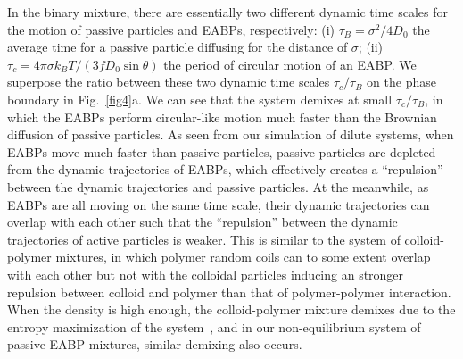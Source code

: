 \documentclass[prl, twocolumn, showpacs, preprintnumbers,amsmath,amssymb]{revtex4-1}
\begin{document}
In the binary mixture, there are essentially two different dynamic time scales for the motion of passive particles and EABPs, respectively: (i) $\tau_B = \sigma^2/4D_0$ the average time for a passive particle diffusing for the distance of $\sigma$; (ii) $\tau_c=4\pi\sigma k_BT/(3 f D_0 \sin\theta )$ the period of circular motion of an EABP. We superpose the ratio between these two dynamic time scales $\tau_c/\tau_B$ on the phase boundary in Fig.~\ref{fig4}a. We can see that the system demixes at small $\tau_c/\tau_B$, in which the EABPs perform circular-like motion much faster than the Brownian diffusion of passive particles. As seen from our simulation of dilute systems, when EABPs move much faster than passive particles, passive particles are depleted from the dynamic trajectories of EABPs, which effectively creates a ``repulsion'' between the dynamic trajectories and passive particles. At the meanwhile, as EABPs are all moving on the same time scale, their dynamic trajectories can overlap with each other such that the ``repulsion'' between the dynamic trajectories of active particles is weaker. This is similar to the system of colloid-polymer mixtures, in which polymer random coils can to some extent overlap with each other but not with the colloidal particles inducing an stronger repulsion between colloid and polymer than that of polymer-polymer interaction. When the density is high enough, the colloid-polymer mixture demixes due to the entropy maximization of the system~\cite{colloid_polymer}, and in our non-equilibrium system of passive-EABP mixtures, similar demixing also occurs. 
\end{document}
